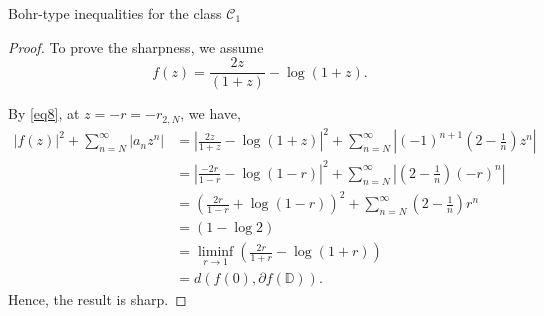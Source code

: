 \documentclass[12pt,a4paper,reqno]{amsart}
\theoremstyle{definition}
\theoremstyle{plain}
\numberwithin{equation}{section}
\begin{document}
\begin{section}{Bohr-type inequalities for the class $\mathcal{C}_1$}
\begin{proof}
To prove the sharpness, we assume
\begin{equation*}
    f(z)=\frac{2z}{(1+z)}- \log(1+z).
\end{equation*}

By \eqref{eq8}, at $z=-r=-r_{2,N}$, we have,
\begin{align*}
|f(z)|^2 + \sum_{n=N}^{\infty} |a_n z^n| & =
\left| \frac{2z}{1+z} -\log(1+z) \right|^2 + \sum_{n=N}^{\infty} \left| (-1)^{n+1}\left( 2-\frac{1}{n} \right) z^{n} \right|\\
&= \left| \frac{-2r}{1-r} -\log(1-r) \right|^2 + \sum_{n=N}^{\infty} \left|\left( 2-\frac{1}{n} \right) (-r)^{n} \right|\\
&= \left( \frac{2r}{1-r} +\log(1-r) \right)^2 + \sum_{n=N}^{\infty} \left( 2-\frac{1}{n} \right) r^{n}\\
&=(1 - \log{2})\\
&=\liminf \limits_{r \rightarrow 1} \left(\frac{2r}{1+r}- \log(1+r)\right)\\
&=d(f(0), \partial{f(\mathbb{D})}).
\end{align*}
Hence, the result is sharp.
\end{proof}


\end{section}
\end{document}
